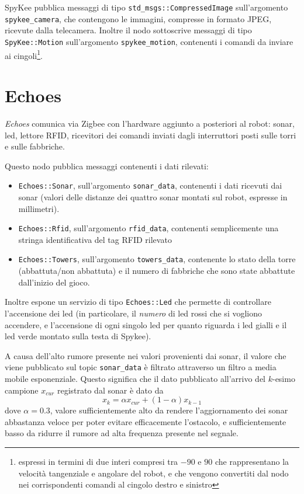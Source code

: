 SpyKee pubblica messaggi di tipo \verb|std_msgs::CompressedImage| sull'argomento \verb|spykee_camera|, che contengono le immagini, compresse in formato JPEG, ricevute dalla telecamera. Inoltre il nodo sottoscrive messaggi di tipo \verb|SpyKee::Motion| sull'argomento \verb|spykee_motion|, contenenti i comandi da inviare ai cingoli\footnote{espressi in termini di due interi compresi tra $-90$ e $90$ che rappresentano la velocità tangenziale e angolare del robot, e che vengono convertiti dal nodo nei corrispondenti comandi al cingolo destro e sinistro}.

\section{Echoes}
\emph{Echoes} comunica via Zigbee con l'hardware aggiunto a posteriori al robot: sonar, led, lettore RFID, ricevitori dei comandi inviati dagli interruttori posti sulle torri e sulle fabbriche.

Questo nodo pubblica messaggi contenenti i dati rilevati:
\begin{itemize}
	\item \verb|Echoes::Sonar|, sull'argomento \verb|sonar_data|, contenenti i dati ricevuti dai sonar (valori delle distanze dei quattro sonar montati sul robot, espresse in millimetri). 
	\item \verb|Echoes::Rfid|, sull'argomento \verb|rfid_data|, contenenti semplicemente una stringa identificativa del tag RFID rilevato
	\item \verb|Echoes::Towers|, sull'argomento \verb|towers_data|, contenente lo stato della torre (abbattuta/non abbattuta) e il numero di fabbriche che sono state abbattute dall'inizio del gioco. %
\end{itemize}
Inoltre espone un servizio di tipo \verb|Echoes::Led| che permette di controllare l'accensione dei led (in particolare, il \emph{numero} di led rossi che si vogliono accendere, e l'accensione di ogni singolo led per quanto riguarda i led gialli e il led verde montato sulla testa di Spykee). %

A causa dell'alto rumore presente nei valori provenienti dai sonar, il valore che viene pubblicato sul topic \verb|sonar_data| è filtrato attraverso un filtro a media mobile esponenziale. Questo significa che il dato pubblicato all'arrivo del $k$-esimo campione $x_{cur}$ registrato dal sonar è dato da %
  \[ x_k = \alpha x_{cur} + (1 - \alpha) x_{k-1} \]
dove $\alpha = 0.3$, valore sufficientemente alto da rendere l'aggiornamento dei sonar abbastanza veloce per poter evitare efficacemente l'ostacolo, e sufficientemente basso da ridurre il rumore ad alta frequenza presente nel segnale.


